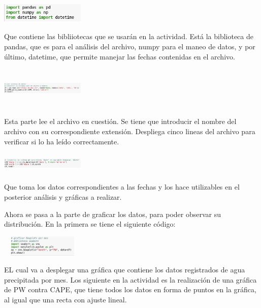 \documentclass{article}
\begin{document}
\begin{center}
  \includegraphics[width=4cm, height=1cm]{inicio.png}
\end{center}



Que contiene las bibliiotecas que se usarán en la actividad. Está la biblioteca de pandas, que es para el análisis del archivo, numpy para el maneo de datos, y por último, datetime, que permite manejar las fechas contenidas en el archivo.

\begin{center}
  \includegraphics[width=4cm, height=2cm]{leer.png}
\end{center}

Esta parte lee el archivo en cuestión. Se tiene que introducir el nombre del archivo con su correspondiente extensión. Despliega cinco lineas del archivo para verificar si lo ha leído correctamente.

\begin{center}
  \includegraphics[width=4cm, height=1cm]{convertir.png}
\end{center}

Que toma los datos correspondientes a las fechas y los hace utilizables en el posterior análisis y gráficas a realizar.

Ahora se pasa a la parte de graficar los datos, para poder observar su distribución. En la primera se tiene el siguiente código:

\begin{center}
  \includegraphics[width=4cm, height=1cm]{PWbot.png}
\end{center}

EL cual va a desplegar una gráfica que contiene los datos registrados de agua precipitada por mes.
Los siguiente en la actividad es la realización de una gráfica de PW contra CAPE, que tiene todos los datos en forma de puntos en la gráfica, al igual que una recta con ajuste lineal.
\end{document}

